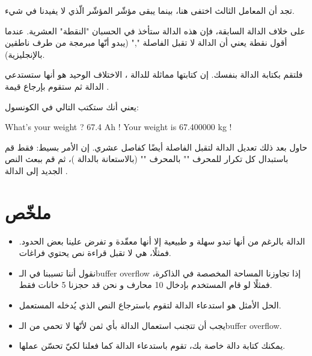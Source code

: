 تجد أن المعامل الثالث
اختفى هنا، بينما يبقى مؤشّر المؤشّر
الّذي لا يفيدنا في شيء.

على خلاف الدالة السابقة، فإن هذه الدالة ستأخذ في الحسبان "النقطة" العشرية. عندما أقول نقطة يعني أن الدالة لا تقبل الفاصلة
"\textenglish{,}"
(يبدو أنّها مبرمجة من طرف ناطقين بالإنجليزية).

فلتقم بكتابة الدالة
بنفسك. إن كتابتها مماثلة للدالة
،
الاختلاف الوحيد هو أنها ستستدعي الدالة
ثم ستقوم بإرجاع قيمة
.

يعني أنك ستكتب التالي في الكونسول:

\begin{Console}
  What's your weight ? 67.4
  Ah ! Your weight is 67.400000 kg !
\end{Console}


حاول بعد ذلك تعديل الدالة
لتقبل الفاصلة أيضًا كفاصل عشري. إن الأمر بسيط: فقط قم باستبدال كل تكرار للمحرف
"\InlineCode{,}"
بالمحرف
""
(بالاستعانة بالدالة
)،
ثم قم ببعث النص الجديد إلى الدالة
.

\section*{ملخّص}

\begin{itemize}
  \item الدالة
بالرغم من أنها تبدو سهلة و طبيعية إلا أنها معقّدة و تفرض علينا بعض الحدود. فمثلًا، هي لا تقبل قراءة نص يحتوي فراغات.
  \item نقول أننا تسببنا في الـ\textenglish{buffer overflow}
إذا تجاوزنا المساحة المخصصة في الذاكرة، فمثلًا لو قام المستخدم بإدخال 10 محارف و نحن قد حجزنا 5 خانات فقط.
  \item الحل الأمثل هو استدعاء الدالة
لتقوم باسترجاع النص الذي يُدخله المستعمل.
  \item يجب أن تتجنب استعمال الدالة
بأي ثمن لأنّها لا تحمي من الـ\textenglish{buffer overflow}.
  \item يمكنك كتابة دالة خاصة بك، تقوم باستدعاء الدالة
كما فعلنا لكيّ تحسّن عملها.
\end{itemize}
